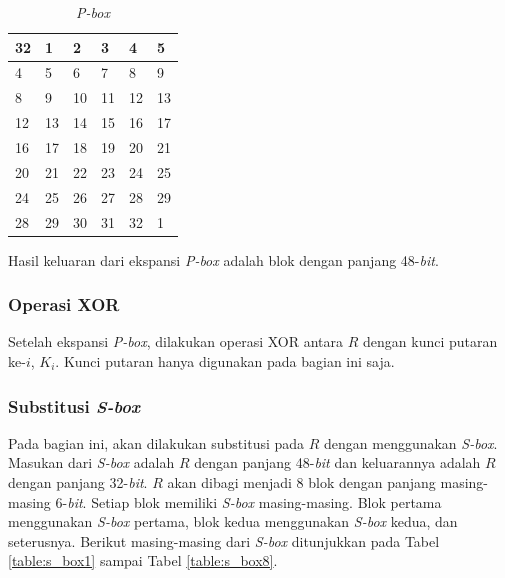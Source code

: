 \begin{table}[H]
	\begin{center}
		\caption{\textit{P-box}}\label{table:Pbox}
		\begin{tabular}{|l|l|l|l|l|l|}
				\hline
				32 	& 1		& 2 	& 3 	& 4 	& 5		\\ \hline
				4 	& 5		& 6 	& 7 	& 8 	& 9		\\ \hline
				8 	& 9		& 10 	& 11 	& 12 	& 13	\\ \hline
				12 	& 13	& 14 	& 15 	& 16 	& 17	\\ \hline
				16 	& 17	& 18 	& 19 	& 20 	& 21	\\ \hline
				20 	& 21	& 22 	& 23 	& 24 	& 25	\\ \hline
				24 	& 25	& 26 	& 27 	& 28 	& 29	\\ \hline
				28 	& 29	& 30 	& 31 	& 32 	& 1		\\ \hline
		\end{tabular}
	\end{center}
\end{table}

Hasil keluaran dari ekspansi \textit{P-box} adalah blok dengan panjang 48-\textit{bit}.

\subsubsection{Operasi XOR}
Setelah ekspansi \textit{P-box}, dilakukan operasi XOR antara \begin{math}R\end{math} dengan kunci putaran ke-\begin{math}i\end{math}, \begin{math}K_i\end{math}. Kunci putaran hanya digunakan pada bagian ini saja.

\subsubsection{Substitusi \textit{S-box}}

Pada bagian ini, akan dilakukan substitusi pada \begin{math}R\end{math} dengan menggunakan \textit{S-box}. Masukan dari \textit{S-box} adalah \begin{math}R\end{math} dengan panjang 48-\textit{bit} dan keluarannya adalah \begin{math}R\end{math} dengan panjang 32-\textit{bit}. \begin{math}R\end{math} akan dibagi menjadi 8 blok dengan panjang masing-masing 6-\textit{bit}. Setiap blok memiliki \textit{S-box} masing-masing. Blok pertama menggunakan \textit{S-box} pertama, blok kedua menggunakan \textit{S-box} kedua, dan seterusnya. Berikut masing-masing dari \textit{S-box} ditunjukkan pada Tabel \ref{table:s_box1} sampai Tabel \ref{table:s_box8}.

